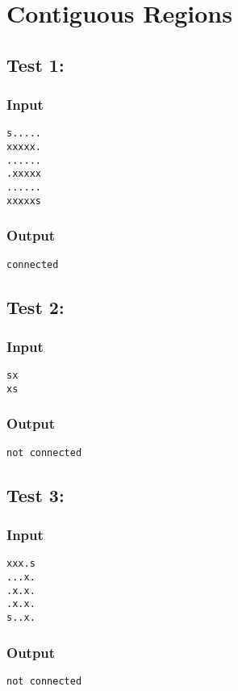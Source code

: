 \documentclass[twocolumn,9pt]{extarticle}
\begin{document}
\newpage
\section{Contiguous Regions}
\subsection*{Test 1:}
\subsubsection*{Input}
\texttt{s.....\\
xxxxx.\\
......\\
.xxxxx\\
......\\
xxxxxs}

\subsubsection*{Output}
\texttt{connected}

\subsection*{Test 2:}
\subsubsection*{Input}
\texttt{sx\\
xs}

\subsubsection*{Output}
\texttt{not connected}

\subsection*{Test 3:}
\subsubsection*{Input}
\texttt{xxx.s\\
...x.\\
.x.x.\\
.x.x.\\
s..x.}

\subsubsection*{Output}
\texttt{not connected}
\end{document}
